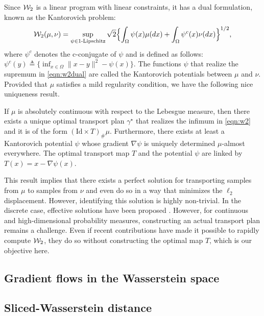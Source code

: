 Since ${\cal W}_2$ is a linear program with linear constraints, it has a dual formulation, known as the Kantorovich problem:
\begin{align}
{\cal W}_2(\mu,\nu) = \sup_{\psi \in \textnormal{1-Lipschitz}} \sqrt{2}\Bigl\{ \int_\Omega \psi(x) \mu(dx) + \int_\Omega \psi^c(x) \nu(dx) \Bigr\}^{1/2}, \label{eqn:w2dual}
\end{align}
where $\psi^c$ denotes the c-conjugate of $\psi$ and is defined as follows: $\psi^c(y) \triangleq \{ \inf_{x\in \Omega} \| x-y\|^2 - \psi(x)\}$. The functions $\psi$ that realize the supremum in \eqref{eqn:w2dual} are called the Kantorovich potentials between $\mu$ and $\nu$.
%
Provided that $\mu$ satisfies a mild regularity condition, we have the following nice uniqueness result.
\begin{thm}
\label{thm:unqmap}
If $\mu$ is absolutely continuous with respect to the Lebesgue measure, then there exists a unique optimal transport plan $\gamma^\star$ that realizes the infimum in \eqref{eqn:w2} and it is of the form $(\text{Id} \times T)_\# \mu$. Furthermore, there exists at least a Kantorovich potential $\psi$ whose gradient $\nabla \psi$ is uniquely determined $\mu$-almost everywhere. The optimal transport map $T$ and the potential $\psi$ are linked by $T(x) = x- \nabla \psi(x)$.
\end{thm}
 

This result implies that there exists a perfect solution for transporting samples from $\mu$ to samples from $\nu$ and even do so in a way that minimizes the $\ell_2$ displacement. However, identifying this solution is highly non-trivial. In the discrete case, effective solutions have been proposed \cite{cuturi2013sinkhorn}. However, for continuous and high-dimensional probability measures, constructing an actual transport plan remains a challenge. Even if recent contributions \cite{genevay2016stochastic} have made it possible to rapidly compute ${\cal W}_2$, they do so without constructing the optimal map $T$, which is our objective here.


\subsection{Gradient flows in the Wasserstein space}



\subsection{Sliced-Wasserstein distance}

